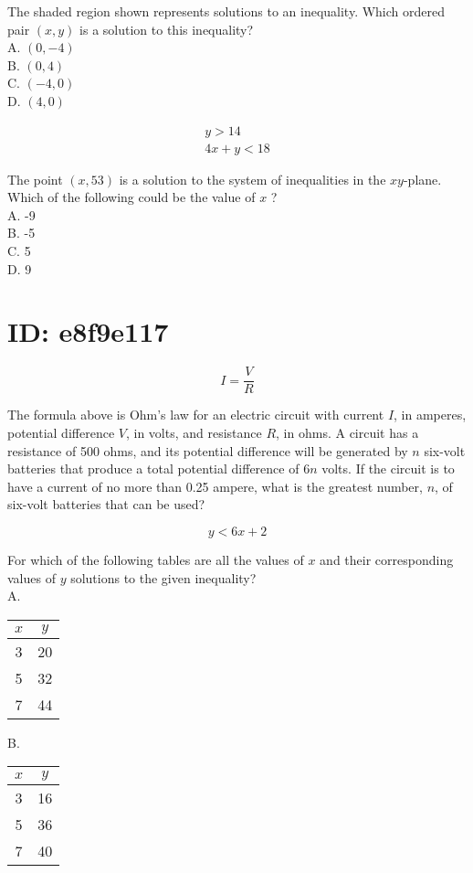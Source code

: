 The shaded region shown represents solutions to an inequality. Which ordered pair $(x, y)$ is a solution to this inequality?\\
A. $(0,-4)$\\
B. $(0,4)$\\
C. $(-4,0)$\\
D. $(4,0)$

$$
\begin{gathered}
y>14 \\
4 x+y<18
\end{gathered}
$$

The point $(x, 53)$ is a solution to the system of inequalities in the $x y$-plane. Which of the following could be the value of $x$ ?\\
A. -9\\
B. -5\\
C. 5\\
D. 9

\section*{ID: e8f9e117}
$$
I=\frac{V}{R}
$$

The formula above is Ohm's law for an electric circuit with current $I$, in amperes, potential difference $V$, in volts, and resistance $R$, in ohms. A circuit has a resistance of 500 ohms, and its potential difference will be generated by $n$ six-volt batteries that produce a total potential difference of $6 n$ volts. If the circuit is to have a current of no more than 0.25 ampere, what is the greatest number, $n$, of six-volt batteries that can be used?

$$
y<6 x+2
$$

For which of the following tables are all the values of $x$ and their corresponding values of $y$ solutions to the given inequality?\\
A.

\begin{center}
\begin{tabular}{|c|c|}
\hline
$x$ & $y$ \\
\hline
3 & 20 \\
\hline
5 & 32 \\
\hline
7 & 44 \\
\hline
\end{tabular}
\end{center}

B.

\begin{center}
\begin{tabular}{|c|c|}
\hline
$x$ & $y$ \\
\hline
3 & 16 \\
\hline
5 & 36 \\
\hline
7 & 40 \\
\hline
\end{tabular}
\end{center}

